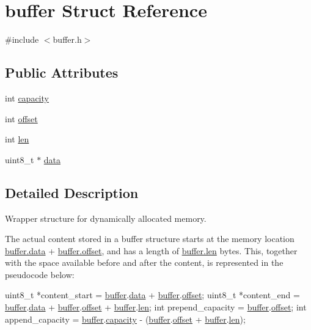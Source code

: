 \hypertarget{structbuffer}{}\section{buffer Struct Reference}
\label{structbuffer}


{\ttfamily \#include $<$buffer.\+h$>$}

\subsection*{Public Attributes}
\begin{DoxyCompactItemize}
\item 
int \hyperlink{structbuffer_a1fb6dcafc58a5ddc11c4d60c09a2e086}{capacity}
\item 
int \hyperlink{structbuffer_af5c1acadd937a2944674832497ba63ad}{offset}
\item 
int \hyperlink{structbuffer_ada52eab703a091ff327114b3b3b0140a}{len}
\item 
uint8\+\_\+t $\ast$ \hyperlink{structbuffer_a5d2300c691699fd563f7a1a280c2c2d6}{data}
\end{DoxyCompactItemize}


\subsection{Detailed Description}
Wrapper structure for dynamically allocated memory.

The actual content stored in a {\ttfamily buffer} structure starts at the memory location {\ttfamily \hyperlink{structbuffer_a5d2300c691699fd563f7a1a280c2c2d6}{buffer.\+data}} {\ttfamily +} {\ttfamily \hyperlink{structbuffer_af5c1acadd937a2944674832497ba63ad}{buffer.\+offset}}, and has a length of {\ttfamily \hyperlink{structbuffer_ada52eab703a091ff327114b3b3b0140a}{buffer.\+len}} bytes. This, together with the space available before and after the content, is represented in the pseudocode below\+: 
\begin{DoxyCode}
uint8\_t *content\_start    = \hyperlink{structbuffer}{buffer}.\hyperlink{structbuffer_a5d2300c691699fd563f7a1a280c2c2d6}{data} + \hyperlink{structbuffer}{buffer}.\hyperlink{structbuffer_af5c1acadd937a2944674832497ba63ad}{offset};
uint8\_t *content\_end      = \hyperlink{structbuffer}{buffer}.\hyperlink{structbuffer_a5d2300c691699fd563f7a1a280c2c2d6}{data} + \hyperlink{structbuffer}{buffer}.\hyperlink{structbuffer_af5c1acadd937a2944674832497ba63ad}{offset} + 
      \hyperlink{structbuffer}{buffer}.\hyperlink{structbuffer_ada52eab703a091ff327114b3b3b0140a}{len};
\textcolor{keywordtype}{int}      prepend\_capacity = \hyperlink{structbuffer}{buffer}.\hyperlink{structbuffer_af5c1acadd937a2944674832497ba63ad}{offset};
\textcolor{keywordtype}{int}      append\_capacity  = \hyperlink{structbuffer}{buffer}.\hyperlink{structbuffer_a1fb6dcafc58a5ddc11c4d60c09a2e086}{capacity} - (\hyperlink{structbuffer}{buffer}.\hyperlink{structbuffer_af5c1acadd937a2944674832497ba63ad}{offset} + 
      \hyperlink{structbuffer}{buffer}.\hyperlink{structbuffer_ada52eab703a091ff327114b3b3b0140a}{len});
\end{DoxyCode}
 

